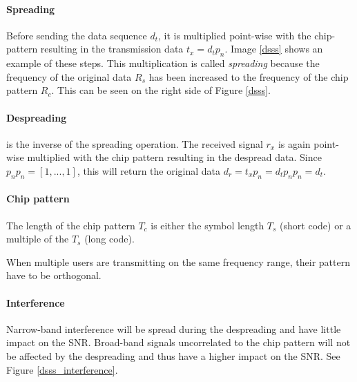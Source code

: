 		\paragraph{Spreading} Before sending the data sequence $d_t$, it is multiplied point-wise with the chip-pattern resulting in the transmission data $t_x = d_t p_n$.
		Image \ref{dsss} shows an example of these steps.
		This multiplication is called \emph{spreading} because the frequency of the original data $R_s$ has been increased to the frequency of the chip pattern $R_c$. This can be seen on the right side of Figure \ref{dsss}.
		
		\paragraph{Despreading} is the inverse of the spreading operation. The received signal $r_x$ is again point-wise multiplied with the chip pattern resulting in the despread data. Since $p_n p_n = [1,...,1]$, this will return the original data $d_r = t_x p_n = d_t p_n p_n = d_t$.
		
		\paragraph{Chip pattern} The length of the chip pattern $T_c$ is either the symbol length $T_s$ (short code) or a multiple of the $T_s$ (long code).
		
		When multiple users are transmitting on the same frequency range, their pattern have to be orthogonal.
		
		\paragraph{Interference} Narrow-band interference will be spread during the despreading and have little impact on the SNR. Broad-band signals uncorrelated to the chip pattern will not be affected by the despreading and thus have a higher impact on the SNR.
		See Figure \ref{dsss_interference}.